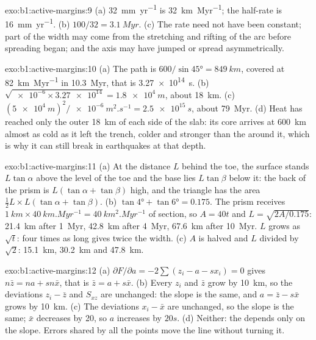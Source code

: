 \begin{solution}{exo:b1:active-margins:9}
(a) \qty{32}{mm.yr^{-1}} is \qty{32}{km.Myr^{-1}}; the half-rate is
\qty{16}{mm.yr^{-1}}. (b) $100/32 = \qty{3.1}{Myr}$. (c) The rate need not
have been constant; part of the width
may come from the stretching and rifting of the arc before spreading began;
and the axis may have jumped or spread asymmetrically.
\end{solution}

\begin{solution}{exo:b1:active-margins:10}
(a) The path is $600/\sin\ang{45} = \qty{849}{km}$, covered at
\qty{82}{km.Myr^{-1}} in \qty{10.3}{Myr}, that is \qty{3.27e14}{s}.
(b) $\sqrt{\num{e-6}\times\num{3.27e14}} = \qty{1.8e4}{m}$, about
\qty{18}{km}. (c) $(\qty{5e4}{m})^2/\qty{e-6}{m^2.s^{-1}} = \qty{2.5e15}{s}$,
about \qty{79}{Myr}. (d) Heat has reached only the outer \qty{18}{km} of each
side of the slab: its core arrives at \qty{600}{km} almost as cold as it left
the trench, colder and stronger than the  around it, which is why it can
still break in earthquakes at that depth.
\end{solution}

\begin{solution}{exo:b1:active-margins:11}
(a) At the distance $L$ behind the toe, the surface stands $L\tan\alpha$ above
the level of the toe and the base lies $L\tan\beta$ below it: the back of the
prism is $L(\tan\alpha + \tan\beta)$ high, and the triangle has the area
$\frac12 L\times L(\tan\alpha + \tan\beta)$. (b) $\tan\ang{4} + \tan\ang{6} =
0.175$. The prism receives $\qty{1}{km}\times\qty{40}{km.Myr^{-1}} =
\qty{40}{km^2.Myr^{-1}}$ of section, so $A = 40t$ and
$L = \sqrt{2A/0.175}$: \qty{21.4}{km} after \qty{1}{Myr}, \qty{42.8}{km}
after \qty{4}{Myr}, \qty{67.6}{km} after \qty{10}{Myr}. $L$ grows as
$\sqrt t$: four times as long gives twice the width. (c) $A$ is halved and $L$
divided by $\sqrt2$: \qty{15.1}{km}, \qty{30.2}{km} and \qty{47.8}{km}.
\end{solution}

\begin{solution}{exo:b1:active-margins:12}
(a) $\partial F/\partial a = -2\sum(z_i - a - s x_i) = 0$ gives
$n\bar z = na + sn\bar x$, that is $\bar z = a + s\bar x$. (b) Every $z_i$ and
$\bar z$ grow by \qty{10}{km}, so the deviations $z_i - \bar z$ and $S_{xz}$
are unchanged: the slope is the same, and $a = \bar z - s\bar x$ grows by
\qty{10}{km}. (c) The deviations $x_i - \bar x$ are unchanged, so the slope is
the same; $\bar x$ decreases by 20, so $a$ increases by $20s$. (d) Neither:
the  depends only on the slope. Errors shared by all the points move the
line without turning it.
\end{solution}


